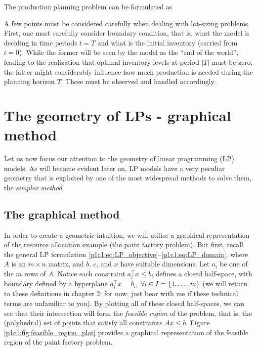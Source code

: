The production planning problem can be formulated as
%
%

A few points must be considered carefully when dealing with lot-sizing problems. First, one must carefully consider boundary condition, that is, what the model is deciding in time periods $t = T$ and what is the initial inventory (carried from $t=0$). While the former will be seen by the model as the ``end of the world'', leading to the realization that optimal inventory levels at period $|T|$ must be zero, the latter might considerably influence how much production is needed during the planning horizon $T$. These must be observed and handled accordingly. 
 


\section{The geometry of LPs - graphical method} 

Let us now focus our attention to the geometry of linear programming (LP) models. As will become evident later on, LP models have a very peculiar geometry that is exploited by one of the most widespread methods to solve them, the \emph{simplex method}. 

\subsection{The graphical method}

In order to create a geometric intuition, we will utilise a graphical representation of the resource allocation example (the paint factory problem). But first, recall the general LP formulation \eqref{p1c1:eq:LP_objective}--\eqref{p1c1:eq:LP_domain}, where $A$ is an $m \times n$ matrix, and $b$, $c$, and $x$ have suitable dimensions. Let $a_i$ be one of the $m$ rows of $A$. Notice each constraint $a_i^\top x \leq b_i$ defines a closed half-space, with boundary defined by a hyperplane $a_i^\top x= b_i$, $\forall i \in I = \left\{ 1,\dots,m \right \}$ (we will return to these definitions in chapter 2; for now, just bear with me if these technical terms are unfamiliar to you). By plotting all of these closed half-spaces, we can see that their intersection will form the \emph{feasible region} of the problem, that is, the (polyhedral) set of points that satisfy all constraints $Ax \le b$. Figure \ref{p1c1:fig:feasible_region_plot} provides a graphical representation of the feasible region of the paint factory problem. 

